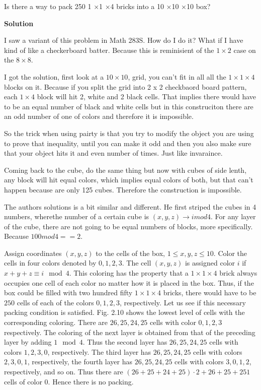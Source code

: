 \documentclass{article}
\begin{document}
Is there a way to pack 250 1 ×1 ×4 bricks into a 10 ×10 ×10 box?

\textbf{Solution}

I saw a variant of this problem in Math 283S. How do I do it? What if I have kind of like a checkerboard batter. 
Because this is reminisient of the $1\times2$ case on the $8\times 8$. 

I got the solution, first look at a $10\times 10$, grid, you can't fit in all
all the $1\times1\times4$ blocks on it. Because if you split the grid into 2 x 2 checkbaord 
board pattern, each $1\times 4$ block will hit 2, white and 2 black cells. That implies there 
would have to be an equal number of black and white cells but in this construciton there are an 
odd number of one of colors and therefore it is impossible.

So the trick when using pairty is that you try to modify the object you are using to prove that 
inequality, until you can make it odd and then you also make sure that your object hits it and 
even number of times. Just like invaraince.

Coming back to the cube, do the same thing but now with cubes of side lenth, any block will hit equal colors,
which implies equal colors of both, but that can't happen because are only 125 cubes. Therefore the construction is impossible.

The authors solutions is a bit similar and different. He first striped the cubes in 4 numbers, wherethe 
number of a certain cube is $(x,y,z) \rightarrow i mod 4$. For any layer of the 
cube, there are not going to be equal numbers of blocks, more specifically. Because $100 mod 4==2$.


Assign coordinates $(x, y, z)$ to the cells of the box, $1 \leq x, y, z \leq 10$. Color the
cells in four colors denoted by $0, 1, 2, 3$. The cell $(x, y, z)$ is assigned color $i$ if
$x + y + z \equiv i \mod 4$. This coloring has the property that a $1 \times 1 \times 4$ brick always
occupies one cell of each color no matter how it is placed in the box. Thus, if the box
could be filled with two hundred fifty $1 \times 1 \times 4$ bricks, there would have to be $250$
cells of each of the colors $0, 1, 2, 3$, respectively. Let us see if this necessary packing
condition is satisfied. Fig. 2.10 shows the lowest level of cells with the corresponding
coloring. There are $26, 25, 24, 25$ cells with color $0, 1, 2, 3$ respectively. The coloring
of the next layer is obtained from that of the preceding layer by adding $1 \mod 4$.
Thus the second layer has $26, 25, 24, 25$ cells with colors $1, 2, 3, 0$, respectively. The
third layer has $26, 25, 24, 25$ cells with colors $2, 3, 0, 1$, respectively, the fourth layer
has $26, 25, 24, 25$ cells with colors $3, 0, 1, 2$, respectively, and so on. Thus there are
$(26 + 25 + 24 + 25) \cdot 2 + 26 + 25 + 251$ cells of color $0$. Hence there is no packing.
\end{document}
